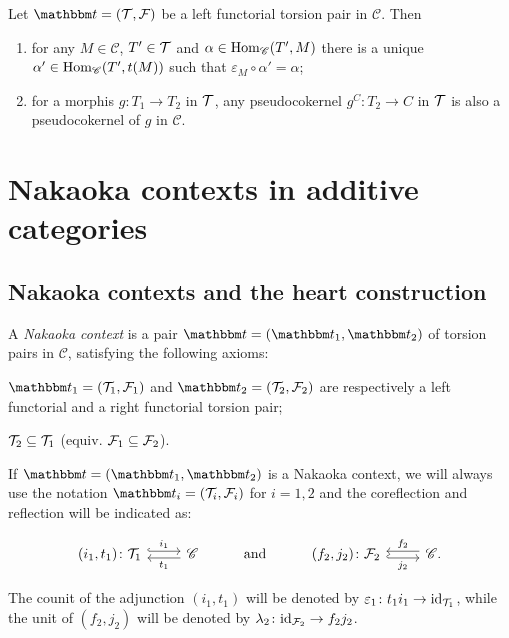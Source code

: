 \begin{lemma}\label{rmk:1.1}
  Let $\t=(\T,\F)$ be a left functorial torsion pair in $\mathscr{C}$. Then
\begin{enumerate}[label=(\alph*)]
\item\label{rmk:1.1a} for any $M\in\mathscr{C}$, $T'\in\mathcal{T}$ and $\alpha\in\operatorname{Hom}_\mathscr{C}(T',M)$ there is a unique $\alpha'\in\operatorname{Hom}_\mathscr{C}(T',t(M))$ such that $\varepsilon_M\circ\alpha'=\alpha$;

\item\label{rmk:1.1b} for a morphis $g:T_1\to T_2$ in $\mathcal{T}$, any pseudocokernel $g^C:T_2\to C$ in $\mathcal{T}$ is also a pseudocokernel of $g$ in $\mathscr{C}$.
\end{enumerate}
\end{lemma}

\section{Nakaoka contexts in additive categories}
\subsection{Nakaoka contexts and the heart construction}

\begin{definition}
  A \emph{Nakaoka context} is a pair $\t=(\t_1,\t_2)$ of torsion pairs in $\mathscr{C}$, satisfying the following axioms:
  \begin{torsionaxioms}
    \item\label{ax:ct1} $\t_1=(\T_1,\F_1)$ and $\t_2=(\T_2,\F_2)$ are respectively a left functorial and a right functorial torsion pair;
    \item\label{ax:ct2} $\mathcal{T}_2\subseteq \mathcal{T}_1$ (equiv. $\mathcal{F}_1\subseteq\mathcal{F}_2$).
  \end{torsionaxioms}
\end {definition}

\begin{notation}
  If $\t=(\t_1,\t_2)$ is a Nakaoka context, we will always use the notation $\t_i = (\T_i,\F_i)$ for $i=1,2$ and the coreflection and reflection will be indicated as:

\begin{equation*}
\begin{tikzcd}
(i_1,t_1)\colon\T_1\arrow[hook, shift left]{r}{i_1}
& \mathscr{C}\arrow[shift left]{l}{t_1}
& \mathrm{and}
& (f_2,j_2)\colon\F_2\arrow[hook, shift right]{r}[']{j_2}
& \mathscr{C}\arrow[shift right]{l}[']{f_2}.
\end{tikzcd}
\end{equation*}

The counit of the adjunction $(i_1,t_1)$ will be denoted by $\varepsilon_1\colon t_1i_1\to \mathrm{id}_{\mathcal{T}_1}$, while the unit of $(f_2,j_2)$ will be denoted by $\lambda_2\colon \mathrm{id}_{\mathcal{F}_2}\to f_2j_2$.
\end{notation}

